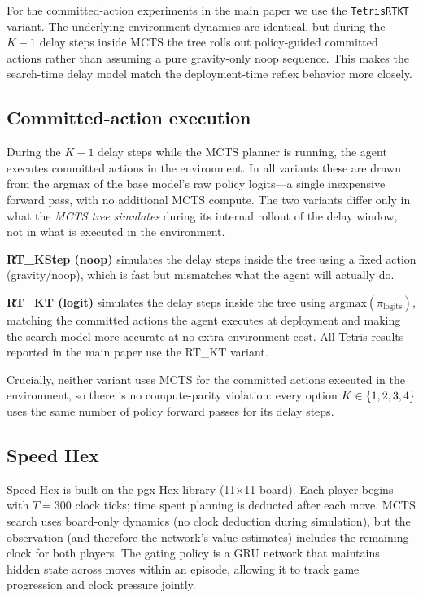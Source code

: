 For the committed-action experiments in the main paper we use the \texttt{TetrisRTKT}
variant. The underlying environment dynamics are identical, but during the $K{-}1$
delay steps inside MCTS the tree rolls out policy-guided committed actions rather
than assuming a pure gravity-only noop sequence. This makes the search-time delay
model match the deployment-time reflex behavior more closely.

\subsection{Committed-action execution}
\label{app:committed_action}

During the $K{-}1$ delay steps while the MCTS planner is running, the agent executes
committed actions in the environment.
In all variants these are drawn from the argmax of the base model's raw policy
logits---a single inexpensive forward pass, with no additional MCTS compute.
The two variants differ only in what the \emph{MCTS tree simulates} during its internal
rollout of the delay window, not in what is executed in the environment.

\textbf{RT\_KStep (noop)} simulates the delay steps inside the tree using a fixed
action (gravity/noop), which is fast but mismatches what the agent will actually do.

\textbf{RT\_KT (logit)} simulates the delay steps inside the tree using
$\mathrm{argmax}(\pi_{\mathrm{logits}})$, matching the committed actions the agent
executes at deployment and making the search model more accurate at no extra
environment cost.
All Tetris results reported in the main paper use the RT\_KT variant.

Crucially, neither variant uses MCTS for the committed actions executed in the
environment, so there is no compute-parity violation: every option $K \in \{1,2,3,4\}$
uses the same number of policy forward passes for its delay steps.

\subsection{Speed Hex}
Speed Hex is built on the pgx Hex library (11$\times$11 board).
Each player begins with $T = 300$ clock ticks; time spent planning is deducted after
each move.
MCTS search uses board-only dynamics (no clock deduction during simulation), but the
observation (and therefore the network's value estimates) includes the remaining
clock for both players.
The gating policy is a GRU network that maintains hidden state across moves within an
episode, allowing it to track game progression and clock pressure jointly.

